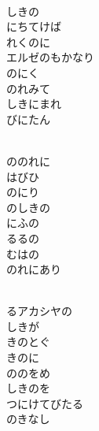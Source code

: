 \documentclass[10pt,b5j]{tarticle} %
\begin{document}
\begin{enumerate}
\begin{minipage}[c]{\blocksize}
        \vspace{\linespace}
        \item~\\
        しきの\\
        にちてけば\\
        れくのに\\
        エルゼのもかなり\\
        のにく\\
        のれみて\\
        しきにまれ\\
        びにたん
        
        \vspace{\linespace}
        \item~\\
        ののれに\\
        はびひ\\
        のにり\\
        のしきの\\
        にふの\\
        るるの\\
        むはの\\
        のれにあり
        
        \vspace{\linespace}
        \item~\\
        るアカシヤの\\
        しきが\\
        きのとぐ\\
        きのに\\
        ののをめ\\
        しきのを\\
        つにけてびたる\\
        のきなし
        

\end{minipage}
\end{enumerate}
\end{document}
